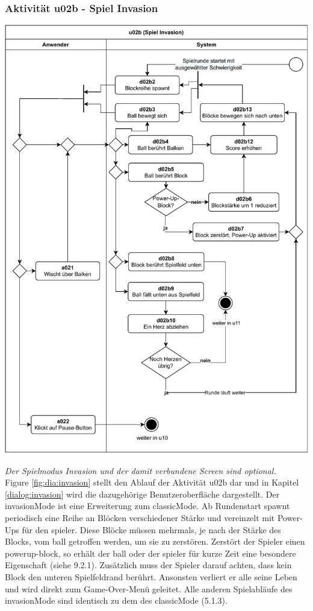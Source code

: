 \clearpage
\subsubsection{Aktivität u02b - Spiel Invasion}

\vspace*{1cm}

\includegraphics[width=\linewidth]{diagramme/pdf/UML-Activity-u02b.pdf}
\label{fig:dia:invasion}
\vspace*{0.5cm}


\textit{Der Spielmodus Invasion und der damit verbundene Screen sind optional.}
\\
Figure \ref{fig:dia:invasion} stellt den Ablauf der Aktivität u02b dar und in Kapitel \ref{dialog:invasion} wird die dazugehörige Benutzeroberfläche dargestellt.
Der \gls{invasionMode} ist eine Erweiterung zum \gls{classicMode}. Ab Rundenstart spawnt periodisch eine Reihe an Blöcken verschiedener Stärke und vereinzelt mit Power-Ups für den \gls{spieler}. Diese Blöcke müssen mehrmals, je nach der Stärke des Blocks, vom \gls{ball} getroffen werden, um sie zu zerstören. Zerstört der Spieler einen \gls{powerup}-\gls{block}, so erhält der \gls{ball} oder der \gls{spieler} für kurze Zeit eine besondere Eigenschaft (siehe 9.2.1). 
Zusätzlich muss der Spieler darauf achten, dass kein Block den unteren Spielfeldrand berührt. Ansonsten verliert er alle seine Leben und wird direkt zum Game-Over-Menü geleitet. Alle anderen Spielabläufe des \gls{invasionMode} sind identisch zu dem des \gls{classicMode} (5.1.3).


